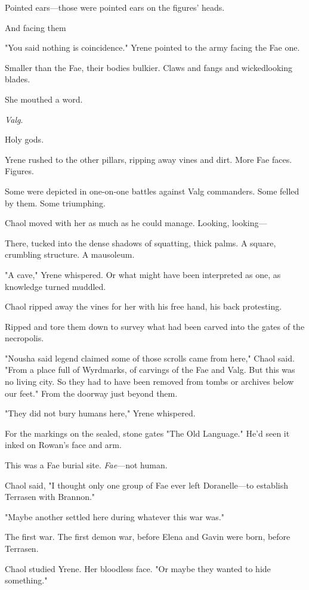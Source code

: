 Pointed ears---those were pointed ears on the figures' heads.

And facing them 

"You said nothing is coincidence." Yrene pointed to the army facing the Fae one.

Smaller than the Fae, their bodies bulkier. Claws and fangs and wickedlooking blades.

She mouthed a word.

\emph{Valg}.

Holy gods.

Yrene rushed to the other pillars, ripping away vines and dirt. More Fae faces. Figures.

Some were depicted in one-on-one battles against Valg commanders. Some felled by them. Some triumphing.

Chaol moved with her as much as he could manage. Looking, looking---

There, tucked into the dense shadows of squatting, thick palms. A square, crumbling structure. A mausoleum.

"A cave," Yrene whispered. Or what might have been interpreted as one, as knowledge turned muddled.

Chaol ripped away the vines for her with his free hand, his back protesting.

Ripped and tore them down to survey what had been carved into the gates of the necropolis.

"Nousha said legend claimed some of those scrolls came from here," Chaol said. "From a place full of Wyrdmarks, of carvings of the Fae and Valg. But this was no living city. So they had to have been removed from tombs or archives below our feet." From the doorway just beyond them.

"They did not bury humans here," Yrene whispered.

For the markings on the sealed, stone gates  "The Old Language." He'd seen it inked on Rowan's face and arm.

This was a Fae burial site. \emph{Fae}---not human.

Chaol said, "I thought only one group of Fae ever left Doranelle---to establish Terrasen with Brannon."

"Maybe another settled here during whatever this war was."

The first war. The first demon war, before Elena and Gavin were born, before Terrasen.

Chaol studied Yrene. Her bloodless face. "Or maybe they wanted to hide something."


